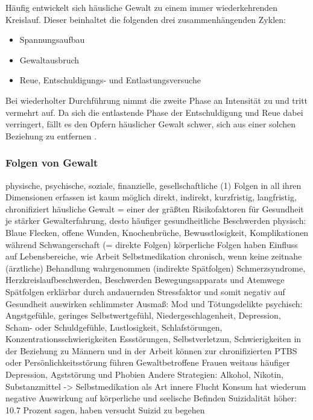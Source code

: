 Häufig entwickelt sich häusliche Gewalt  zu einem immer wiederkehrenden Kreislauf. Dieser beinhaltet die folgenden drei zusammenhängenden Zyklen:
\begin{itemize}
    \item Spannungsaufbau
    \item Gewaltausbruch
    \item Reue, Entschuldigungs- und Entlastungsversuche
\end{itemize}
Bei wiederholter Durchführung nimmt die zweite Phase an Intensität zu und tritt vermehrt auf. Da sich die entlastende Phase der Entschuldigung und Reue dabei verringert, fällt es den Opfern häuslicher Gewalt schwer, sich aus einer solchen Beziehung zu entfernen \parencite{Def_haus_Gewalt}.


\subsubsection{Folgen von Gewalt}     \label{2.1.2.3}
physische, psychische, soziale, finanzielle, gesellschaftliche (1) 
\parencite{Gewaltart}
Folgen in all ihren Dimensionen erfassen ist kaum möglich 
direkt, indirekt, kurzfristig, langfristig, chronifiziert
häusliche Gewalt = einer der gräßten Risikofaktoren für Gesundheit
je stärker Gewalterfahrung, desto häufiger gesundheitliche Beschwerden
physisch:
    Blaue Flecken, offene Wunden, Knochenbrüche, Bewusstlosigkeit, Komplikationen während Schwangerschaft (= direkte Folgen)
    körperliche Folgen haben Einfluss auf Lebensbereiche, wie Arbeit
    Selbstmedikation
    chronisch, wenn keine zeitnahe (ärztliche) Behandlung wahrgenommen
    (indirekte Spätfolgen) Schmerzsyndrome, Herzkreislaufbeschwerden, Beschwerden Bewegungsapparats und Atemwege
    Spätfolgen erklärbar durch andauernden Stressfaktor und somit negativ auf Gesundheit auswirken 
    schlimmster Ausmaß: Mod und Tötungsdelikte
psychisch:
    Angstgefühle, geringes Selbstwertgefühl, Niedergeschlagenheit, Depression, Scham- oder Schuldgefühle, Lustlosigkeit, Schlafstörungen, Konzentrationsschwierigkeiten Essstörungen, Selbstverletzun, Schwierigkeiten in der Beziehung zu Männern und in der Arbeit
    können zur chronifizierten PTBS oder Persönlichkeitsstörung führen
    Gewaltbetroffene Frauen weitaus häufiger Depression, Agststörung und Phobien
    Andere Strategien: Alkohol, Nikotin, Substanzmittel -> Selbstmedikation als Art innere Flucht
    Konsum hat wiederum negative Auswirkung auf körperliche und seelische Befinden
    Suizidalität höher: 10.7 Prozent sagen, haben versucht Suizid zu begehen \parencite{psy_Folgen_hG}
